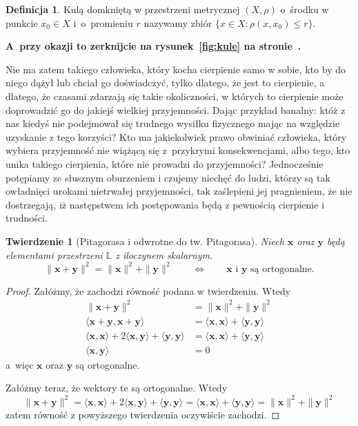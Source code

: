 \documentclass[12pt]{mwbk}
\let\leq\leqslant\let\le\leq\let\geq\geqslant\let\ge\geq
\theoremstyle{plain}
\newtheorem{twier}{Twierdzenie}[chapter] %
\theoremstyle{definition}
\newtheorem{defi}{Definicja}[chapter]
\theoremstyle{remark}
\newcommand{\xx}{\mathbf{x}}
\newcommand{\yy}{\mathbf{y}}
\newcommand{\skalar}[2]{\pmb{\langle}#1,#2\pmb{\rangle}}
\begin{document}
\begin{defi}
	Kulą domkniętą w przestrzeni metrycznej $(X,\rho)$ 
	o~środku w punkcie $x_0\in X$ i~o~promieniu $r$
	nazywamy zbiór $\{x\in X\colon \rho(x,x_0) \leq r\}$. 
\end{defi}

\textbf{
A~przy okazji to zerknijcie na rysunek~\ref{fig:kule} na
stronie~\pageref{fig:kule}.}


Nie ma zatem takiego człowieka, który kocha cierpienie samo w sobie, 
kto by do niego dążył lub chciał go doświadczyć, tylko dlatego, że
jest to cierpienie, a dlatego, że czasami zdarzają się takie 
okoliczności, w których to cierpienie może doprowadzić 
go do jakiejś wielkiej przyjemności. 
Dając przykład banalny: któż z nas kiedyś nie podejmował 
się trudnego wysiłku fizycznego mając na względzie 
uzyskanie z tego korzyści? 
Kto ma jakiekolwiek prawo obwiniać człowieka, 
który wybiera przyjemność nie wiążącą się z~przykrymi 
konsekwencjami, albo tego, kto unika takiego cierpienia, 
które nie prowadzi do przyjemności? 
Jednocześnie potępiamy ze słusznym oburzeniem i czujemy 
niechęć do ludzi, którzy są tak owładnięci urokami nietrwałej 
przyjemności, tak zaślepieni jej pragnieniem, 
że nie dostrzegają, iż następstwem ich 
postępowania będą z pewnością cierpienie i trudności.



\begin{twier}[Pitagorasa i odwrotne do tw.
	Pitagorasa]\label{Pitagoras}
	Niech $\xx$ oraz $\yy$ będą elementami przestrzeni $\mathbb{L}$ z iloczynem
	skalarnym. 
	\[
	\|\xx+\yy\|^2=\|\xx\|^2 + \|\yy\|^2\qquad\iff\qquad
	\text{$\xx$ i $\yy$ są ortogonalne.}
	\]
\end{twier}
\begin{proof}
	Załóżmy, że zachodzi równość podana w twierdzeniu. Wtedy
	\[
	\begin{aligned}
	\|\xx+\yy\|^2&=\|\xx\|^2+\|\yy\|^2\\
	\skalar{\xx+\yy}{\xx+\yy}
	&=\skalar{\xx}{\xx}+\skalar{\yy}{\yy}\\
	\skalar{\xx}{\xx}+2\skalar{\xx}{\yy}+\skalar{\yy}{\yy}
	&=\skalar{\xx}{\xx}+\skalar{\yy}{\yy}\\
	\skalar{\xx}{\yy}&=0
	\end{aligned}
	\]
	a~więc $\xx$ oraz $\yy$ są ortogonalne.

	Załóżmy teraz, że wektory te są ortogonalne. Wtedy
	\[
	\|\xx+\yy\|^2=
	\skalar{\xx}{\xx}+2\skalar{\xx}{\yy}+\skalar{\yy}{\yy}
	=\skalar{\xx}{\xx}+\skalar{\yy}{\yy}=
	\|\xx\|^2+\|\yy\|^2
	\]
	zatem równość z powyższego twierdzenia oczywiście zachodzi.
\end{proof}
\end{document}
